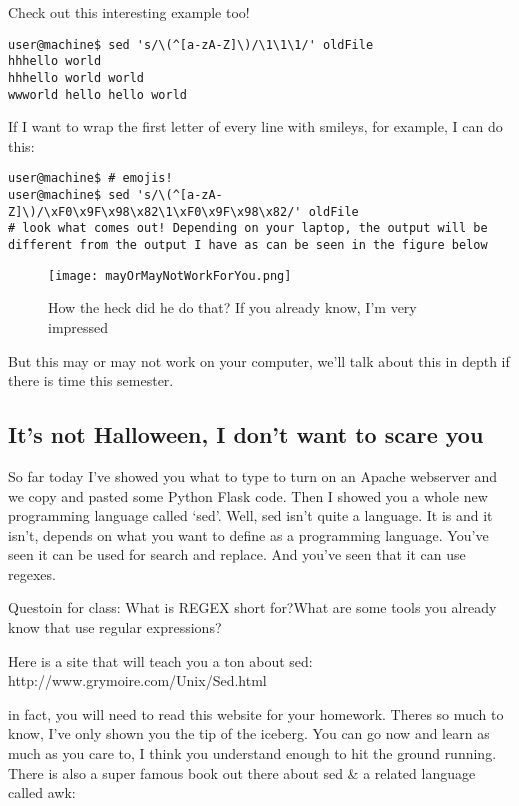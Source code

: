 \documentclass[10pt]{article}
\begin{document}
Check out this interesting example too!

\begin{lstlisting}
user@machine$ sed 's/\(^[a-zA-Z]\)/\1\1\1/' oldFile
hhhello world
hhhello world world
wwworld hello hello world
\end{lstlisting}

If I want to wrap the first letter of every line with smileys, for example, I can do this:

\begin{lstlisting}
user@machine$ # emojis!
user@machine$ sed 's/\(^[a-zA-Z]\)/\xF0\x9F\x98\x82\1\xF0\x9F\x98\x82/' oldFile
# look what comes out! Depending on your laptop, the output will be different from the output I have as can be seen in the figure below
\end{lstlisting}


\begin{figure}[h]
  \centering
    \texttt{[image: mayOrMayNotWorkForYou.png]}
  \caption{How the heck did he do that? If you already know, I'm very impressed}
\end{figure}

But this may or may not work on your computer, we'll talk about this in depth if there is time this semester.

\subsection{It's not Halloween, I don't want to scare you}
So far today I've showed you what to type to turn on an Apache webserver and we copy and pasted some Python Flask code. Then I showed you a whole new programming language called `sed'. Well, sed isn't quite a language. It is and it isn't, depends on what you want to define as a programming language. You've seen it can be used for search and replace. And you've seen that it can use regexes.

\begin{center}
{\LARGE Questoin for class: What is REGEX short for?What are some tools you already know that use regular expressions?}
\end{center}


Here is a site that will teach you a ton about sed:
http://www.grymoire.com/Unix/Sed.html

in fact, you will need to read this website for your homework. Theres so much to know, I've only shown you the tip of the iceberg. You can go now and learn as much as you care to, I think you understand enough to hit the ground running. There is also a super famous book out there about sed \& a related language called awk:
\end{document}
